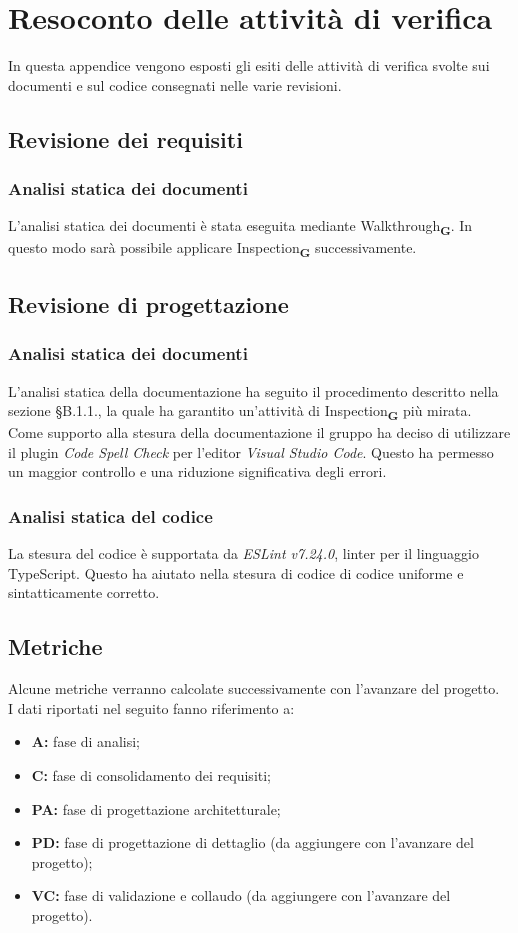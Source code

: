 \section{Resoconto delle attività di verifica}
In questa appendice vengono esposti gli esiti delle attività di verifica svolte sui documenti e sul codice consegnati nelle varie revisioni.
\subsection{Revisione dei requisiti}
\subsubsection{Analisi statica dei documenti}
L'analisi statica dei documenti è stata eseguita mediante Walkthrough\textsubscript{\textbf{G}}. In questo modo sarà possibile applicare Inspection\textsubscript{\textbf{G}} successivamente.
\subsection{Revisione di progettazione}
\subsubsection{Analisi statica dei documenti}
L'analisi statica della documentazione ha seguito il procedimento descritto nella sezione §B.1.1., la quale ha garantito un'attività di Inspection\textsubscript{\textbf{G}} più mirata.\\
Come supporto alla stesura della documentazione il gruppo ha deciso di utilizzare il plugin \textit{Code Spell Check} per l'editor \textit{Visual Studio Code}. Questo ha permesso un maggior controllo e
una riduzione significativa degli errori.
\subsubsection{Analisi statica del codice}
La stesura del codice è supportata da \textit{ESLint v7.24.0}, linter per il linguaggio TypeScript. Questo ha aiutato nella stesura di codice di codice uniforme e sintatticamente corretto.
\subsection{Metriche}
Alcune metriche verranno calcolate successivamente con l'avanzare del progetto.\\
I dati riportati nel seguito fanno riferimento a:
\begin{itemize}
    \item \textbf{A:} fase di analisi;
    \item \textbf{C:} fase di consolidamento dei requisiti;
    \item \textbf{PA:} fase di progettazione architetturale;
    \item \textbf{PD:} fase di progettazione di dettaglio (da aggiungere con l'avanzare del progetto);
    \item \textbf{VC:} fase di validazione e collaudo (da aggiungere con l'avanzare del progetto).
\end{itemize}
\newpage
